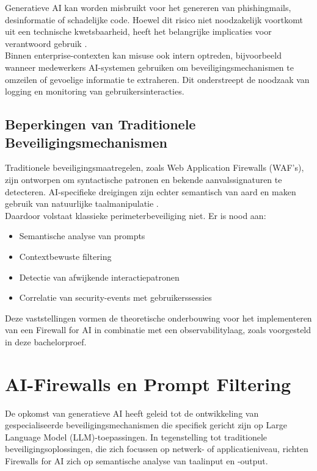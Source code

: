 Generatieve AI kan worden misbruikt voor het genereren van phishingmails, desinformatie of schadelijke code. Hoewel dit risico niet noodzakelijk voortkomt uit een technische kwetsbaarheid, heeft het belangrijke implicaties voor verantwoord gebruik \autocite{dwivedi2023opinion}.\\

Binnen enterprise-contexten kan misuse ook intern optreden, bijvoorbeeld wanneer medewerkers AI-systemen gebruiken om beveiligingsmechanismen te omzeilen of gevoelige informatie te extraheren. Dit onderstreept de noodzaak van logging en monitoring van gebruikersinteracties.\\

\subsection{Beperkingen van Traditionele Beveiligingsmechanismen}

Traditionele beveiligingsmaatregelen, zoals Web Application Firewalls (WAF’s), zijn ontworpen om syntactische patronen en bekende aanvalssignaturen te detecteren. AI-specifieke dreigingen zijn echter semantisch van aard en maken gebruik van natuurlijke taalmanipulatie \autocite{owasp2023llm}.\\

Daardoor volstaat klassieke perimeterbeveiliging niet. Er is nood aan:

\begin{itemize}
    \item Semantische analyse van prompts
    \item Contextbewuste filtering
    \item Detectie van afwijkende interactiepatronen
    \item Correlatie van security-events met gebruikerssessies
\end{itemize}

Deze vaststellingen vormen de theoretische onderbouwing voor het implementeren van een Firewall for AI in combinatie met een observabilitylaag, zoals voorgesteld in deze bachelorproef.


\section{AI-Firewalls en Prompt Filtering}

De opkomst van generatieve AI heeft geleid tot de ontwikkeling van gespecialiseerde beveiligingsmechanismen die specifiek gericht zijn op Large Language Model (LLM)-toepassingen. In tegenstelling tot traditionele beveiligingsoplossingen, die zich focussen op netwerk- of applicatieniveau, richten Firewalls for AI zich op semantische analyse van taalinput en -output.\\

